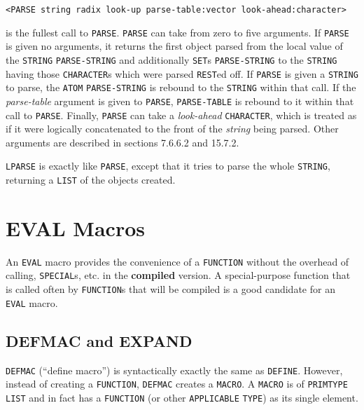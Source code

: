 \documentclass[a4paper]{scrbook}
\begin{document}
\begin{verbatim}
<PARSE string radix look-up parse-table:vector look-ahead:character>
\end{verbatim}

 is the fullest call to \texttt{PARSE}. \texttt{PARSE} can take from zero to five arguments.
If \texttt{PARSE} is given no arguments, it returns the first object parsed from the local value of the \texttt{STRING}
\texttt{PARSE-STRING} and additionally \texttt{SET}s \texttt{PARSE-STRING} to the
\texttt{STRING} having those \texttt{CHARACTER}s which were parsed \texttt{REST}ed off. If \texttt{PARSE} is given a
\texttt{STRING} to parse, the \texttt{ATOM} \texttt{PARSE-STRING} is rebound to the \texttt{STRING} within that call. If
the \emph{parse-table} argument is given to \texttt{PARSE}, \texttt{PARSE-TABLE} is rebound to it within that call to
\texttt{PARSE}. Finally, \texttt{PARSE} can take a \emph{look-ahead} \texttt{CHARACTER}, which is treated as if it were
logically concatenated to the front of the \emph{string} being parsed. Other arguments are described in sections 7.6.6.2
and 15.7.2.

\texttt{LPARSE} is exactly like \texttt{PARSE}, except that it tries to parse the whole
\texttt{STRING}, returning a \texttt{LIST} of the objects created.

\section{EVAL Macros}\label{eval-macros}

An \texttt{EVAL} macro provides the convenience of a \texttt{FUNCTION} without the overhead of calling,
\texttt{SPECIAL}s, etc. in the \textbf{compiled} version. A special-purpose function that is called
often by \texttt{FUNCTION}s that will be compiled is a good candidate for an \texttt{EVAL} macro.

\subsection{DEFMAC and EXPAND}\label{defmac-and-expand}

 \texttt{DEFMAC} (``define macro'') is syntactically exactly the same as \texttt{DEFINE}.
However, instead of creating a \texttt{FUNCTION}, \texttt{DEFMAC} creates a \texttt{MACRO}. A
\texttt{MACRO} is of \texttt{PRIMTYPE} \texttt{LIST} and in fact has a \texttt{FUNCTION} (or other \texttt{APPLICABLE}
\texttt{TYPE}) as its single element.
\end{document}
